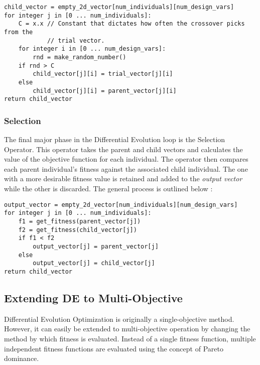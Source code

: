 \begin{lstlisting}[caption=Pseudo-code for the Crossover Operator \cite{diff-evol},captionpos=b]
child_vector = empty_2d_vector[num_individuals][num_design_vars]
for integer j in [0 ... num_individuals]:
    C = x.x // Constant that dictates how often the crossover picks from the
            // trial vector. 
    for integer i in [0 ... num_design_vars]:
        rnd = make_random_number()
	if rnd > C
	    child_vector[j][i] = trial_vector[j][i]
	else
	    child_vector[j][i] = parent_vector[j][i]
return child_vector
\end{lstlisting}

\subsubsection{Selection}
The final major phase in the Differential Evolution loop is the Selection Operator. This operator takes the parent and child vectors and calculates the value of the objective function for each individual. The operator then compares each parent individual's fitness against the associated child individual. The one with a more desirable fitness value is retained and added to the \emph{output vector} while the other is discarded. The general process is outlined below \cite{diff-evol}:

\begin{lstlisting}[label=lst:sel,caption=Pseudocode for the Selection Operator (Assuming a minimization approach) \cite{diff-evol},captionpos=b]
output_vector = empty_2d_vector[num_individuals][num_design_vars]
for integer j in [0 ... num_individuals]:
    f1 = get_fitness(parent_vector[j])
    f2 = get_fitness(child_vector[j])
    if f1 < f2
        output_vector[j] = parent_vector[j]
    else
        output_vector[j] = child_vector[j]
return child_vector
\end{lstlisting}

\subsection{Extending DE to Multi-Objective}
Differential Evolution Optimization is originally a single-objective method. However, it can easily be extended to multi-objective operation by changing the method by which fitness is evaluated. Instead of a single fitness function, multiple independent fitness functions are evaluated using the concept of Pareto dominance. 


